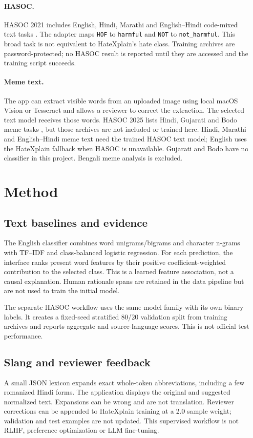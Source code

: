 \documentclass[11pt]{article}
\begin{document}
\paragraph{HASOC.} HASOC 2021 includes English, Hindi, Marathi and English--Hindi code-mixed text tasks \citep{hasoc-2021}. The adapter maps \texttt{HOF} to \texttt{harmful} and \texttt{NOT} to \texttt{not\_harmful}. This broad task is not equivalent to HateXplain's hate class. Training archives are password-protected; no HASOC result is reported until they are accessed and the training script succeeds.

\paragraph{Meme text.} The app can extract visible words from an uploaded image using local macOS Vision or Tesseract and allows a reviewer to correct the extraction. The selected text model receives those words. HASOC 2025 lists Hindi, Gujarati and Bodo meme tasks \citep{hasoc-2025}, but those archives are not included or trained here. Hindi, Marathi and English--Hindi meme text need the trained HASOC text model; English uses the HateXplain fallback when HASOC is unavailable. Gujarati and Bodo have no classifier in this project. Bengali meme analysis is excluded.

\section{Method}
\subsection{Text baselines and evidence}
The English classifier combines word unigrams/bigrams and character n-grams with TF--IDF and class-balanced logistic regression. For each prediction, the interface ranks present word features by their positive coefficient-weighted contribution to the selected class. This is a learned feature association, not a causal explanation. Human rationale spans are retained in the data pipeline but are not used to train the initial model.

The separate HASOC workflow uses the same model family with its own binary labels. It creates a fixed-seed stratified 80/20 validation split from training archives and reports aggregate and source-language scores. This is not official test performance.

\subsection{Slang and reviewer feedback}
A small JSON lexicon expands exact whole-token abbreviations, including a few romanized Hindi forms. The application displays the original and suggested normalized text. Expansions can be wrong and are not translation. Reviewer corrections can be appended to HateXplain training at a 2.0 sample weight; validation and test examples are not updated. This supervised workflow is not RLHF, preference optimization or LLM fine-tuning.
\end{document}
